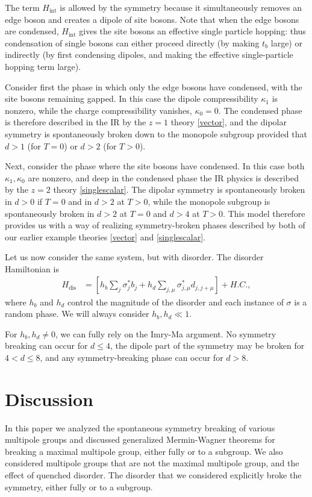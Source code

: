\documentclass[prb,aps,twocolumn, amsfonts,amsmath,amssymb,nofootinbib,superscriptaddress]{revtex4-2}
\begin{document}
The term $H_\text{int}$ is allowed by the symmetry because it simultaneously removes an edge boson and creates a dipole of site bosons. Note that when the edge bosons are condensed, $H_\text{int}$ gives the site bosons an effective single particle hopping: thus condensation of single bosons can either proceed directly (by making $t_b$ large) or indirectly (by first condensing dipoles, and making the effective single-particle hopping term large). 

Consider first the phase in which only the edge bosons have condensed, with the site bosons remaining gapped. In this case the dipole compressibility $\kappa_1$ is nonzero, while the charge compressibility vanishes, $\kappa_0=0$. The condensed phase is therefore described in the IR by the $z=1$ theory \eqref{vector}, and the dipolar symmetry is spontaneously broken down to the monopole subgroup provided that $d>1$ (for $T=0$) or $d>2$ (for $T>0$). 

Next, consider the phase where the site bosons have condensed. In this case both $\kappa_1,\kappa_0$ are nonzero, and deep in the condensed phase the IR physics is described by the $z=2$ theory \eqref{singlescalar}. The dipolar symmetry is spontaneously broken in $d>0$ if $T=0$ and in $d>2$ at $T>0$, while the monopole subgroup is spontaneously broken in $d>2$ at $T=0$ and $d>4$ at $T>0$. This model therefore provides us with a way of realizing symmetry-broken phases described by both of our earlier example theories \eqref{vector} and \eqref{singlescalar}.

Let us now consider the same system, but with disorder.  The disorder Hamiltonian is
\begin{align}
H_\text{dis} &= \left[h_b\sum_j \sigma^*_jb_j + h_d \sum_{j,\mu} \sigma^*_{j,\mu}d_{j,j+\mu}\right] + H.C.,
\end{align}
where $h_b$ and $h_d$ control the magnitude of the disorder and each instance of $\sigma$ is a random phase. We will always consider $h_b,h_d\ll1$.

For $h_b,h_d\ne 0$, we can fully rely on the Imry-Ma argument. No symmetry breaking can occur for $d\le 4$, the dipole part of the symmetry may be broken for $4<d\le 8$, and any symmetry-breaking phase can occur for $d>8$. 

\section{Discussion} \label{sec:disc}

In this paper we analyzed the spontaneous symmetry breaking of various multipole groups and discussed generalized Mermin-Wagner theorems for breaking a maximal multipole group, either fully or to a subgroup. We also considered multipole groups that are not the maximal multipole group, and the effect of quenched disorder. The disorder that we considered explicitly broke the symmetry, either fully or to a subgroup.
\end{document}

